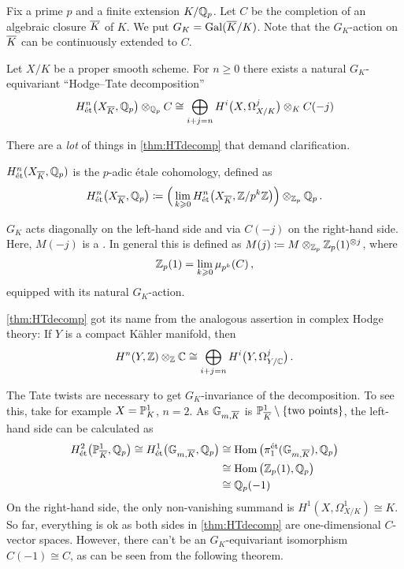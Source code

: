 \documentclass[a4paper, 10pt, oneside, DIV=9, chapterprefix=true, numbers=enddot,bibliography=totoc]{scrbook}
\begin{document}
Fix a prime $p$ and a finite extension $K/\mathbb{Q}_p$. Let $C$ be the completion of an algebraic closure $\ov{K}$ of $K$. We put $G_K=\Gal(\ov{K}/K)$. Note that the $G_K$-action on $\ov{K}$ can be continuously extended to $C$.
\begin{thm}\label{thm:HTdecomp}
	Let $X/K$ be a proper smooth scheme. For $n\geq 0$ there exists a natural $G_K$-equivariant \enquote{Hodge--Tate decomposition}
	\begin{equation*}
		H_\et^n\big(X_{\ov{K}},\IQ_p\big)\otimes_{\IQ_p}C\cong \bigoplus_{i+j=n}H^i\big(X,\Omega_{X/K}^j\big)\otimes_KC(-j)
	\end{equation*}
\end{thm}
\begin{rem}\label{rem:HTdecomp}
	There are a \emph{lot} of things in \cref{thm:HTdecomp} that demand clarification.
	\begin{numerate}
		\item $H_\et^n(X_{\ov{K}},\IQ_p)$ is the $p$-adic étale cohomology, defined as
		\begin{equation*}
			H_\et^n\big(X_{\ov{K}},\IQ_p\big)\coloneqq \Big(\lim_{k\geq 0} H_{\et}^n\big(X_{\ov{K}},\IZ/p^k\IZ\big)\Big)\otimes_{\IZ_p}\IQ_p\,.
		\end{equation*}
		\item $G_K$ acts diagonally on the left-hand side and via $C(-j)$ on the right-hand side. Here, $M(-j)$ is a . In general this is defined as $M(j)\coloneqq M\otimes_{\mathbb{Z}_p}\mathbb{Z}_p(1)^{\otimes j}$, where
		\begin{equation*}
			\mathbb{Z}_p(1)=\lim_{k\geqslant 0}\mu_{p^k}(C)\,,
		\end{equation*}
		equipped with its natural $G_K$-action.
		\item \cref{thm:HTdecomp} got its name from the analogous assertion in complex Hodge theory: If $Y$ is a compact Kähler manifold, then
		\begin{equation*}
			H^n(Y,\mathbb{Z})\otimes_{\mathbb{Z}}\mathbb{C}\cong\bigoplus_{i+j=n}H^i\big(Y,\Omega_{Y/\mathbb{C}}^j\big)\,.
		\end{equation*}
		\item The Tate twists are necessary to get $G_K$-invariance of the decomposition. To see this, take for example $X=\mathbb{P}_K^1$, $n=2$. As $\IG_{m,\ov{K}}$ is $\IP_{\ov{K}}^1\setminus\{\text{two points}\}$, the left-hand side can be calculated as
		\begin{align*}
			H_\et^2\big(\IP_{\ov{K}}^1,\IQ_p\big)\cong H_\et^1\big(\IG_{m,\ov{K}},\IQ_p\big)&\cong \Hom\big(\pi_1^\et(\IG_{m,\ov{K}}),\IQ_p\big)\\
			&\cong \Hom\big(\IZ_p(1),\IQ_p\big)\\
			&\cong \IQ_p(-1)
		\end{align*}
		On the right-hand side, the only non-vanishing summand is $H^1(X,\Omega_{X/K}^1)\cong K$. So far, everything is ok as both sides in \cref{thm:HTdecomp} are one-dimensional $C$-vector spaces. However, there can't be an $G_K$-equivariant isomorphism $C(-1)\cong C$, as can be seen from the following theorem. 
	\end{numerate}
\end{rem}
\end{document}
